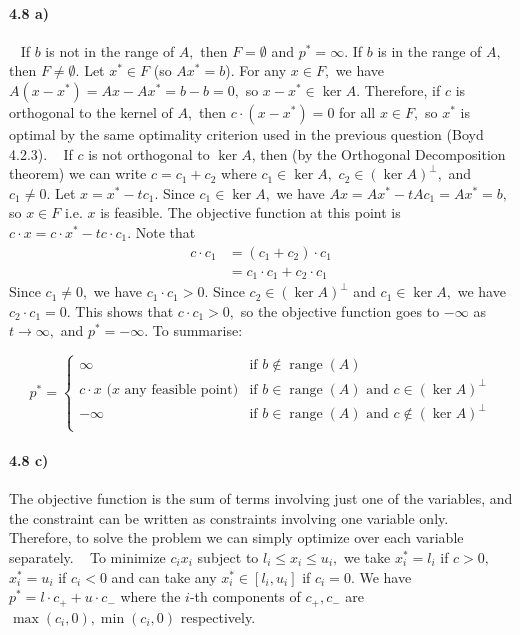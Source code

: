 \documentclass[a4paper,12pt]{article}
\begin{document}
\paragraph{4.8 a)}
\
\newline
If $b$ is not in the range of $A,$ then $F = \emptyset$ and $p^* = \infty.$ If $b$ is in the range of $A,$ then $F\neq \emptyset.$ Let $x^*\in F$ (so $Ax^* = b$). For any $x\in F,$ we have $A(x-x^*) = Ax - Ax^* = b-b = 0,$ so $x-x^*\in \ker A.$ Therefore, if $c$ is orthogonal to the kernel of $A,$ then $c\cdot (x-x^*) = 0$ for all $x\in F,$ so $x^*$ is optimal by the same optimality criterion used in the previous question (Boyd 4.2.3). 
\
\newline
If $c$ is not orthogonal to $\ker A$, then (by the Orthogonal Decomposition theorem) we can write $c = c_1 + c_2$ where $c_1 \in \ker A,$ $c_2 \in (\ker A)^{\perp},$ and $c_1\neq 0.$ Let $x = x^* - tc_1.$ Since $c_1 \in \ker A,$ we have $Ax = Ax^* - tAc_1 = Ax^* = b,$ so $x\in F$ i.e. $x$ is feasible. The objective function at this point is $c\cdot x = c \cdot x^* - t c\cdot c_1.$ Note that
\begin{align*}
 c\cdot c_1 &= (c_1 + c_2)\cdot c_1 \\
            &= c_1\cdot c_1 + c_2 \cdot c_1
\end{align*}
Since $c_1 \neq 0,$ we have $c_1\cdot c_1 > 0.$ Since $c_2 \in (\ker A)^{\perp}$ and $c_1 \in \ker A,$ we have $c_2\cdot c_1 = 0.$ This shows that $c\cdot c_1>0,$ so the objective function goes to $-\infty$ as $t\to \infty,$ and $p^* = -\infty.$  To summarise:


\[
  p^* =
  \begin{cases}
                                   \infty & \text{if $b\notin \operatorname{range}(A)$} \\
                                   c\cdot x \text{ ($x$ any feasible point)} & \text{if $b\in \operatorname{range}(A)$ and $c \in (\ker A)^{\perp}$} \\
                                  -\infty & \text{if $b\in \operatorname{range}(A)$ and $c \notin (\ker A)^{\perp}$} \\
  \end{cases}
\]

\paragraph*{4.8 c)}
The objective function is the sum of terms involving just one of the variables, and the constraint can be written as constraints involving one variable only. Therefore, to solve the problem we can simply optimize over each variable separately.
\
\newline
To minimize $c_i x_i$ subject to $l_i \leq x_i \leq u_i,$ we take $x_i^* = l_i$ if $c>0,$ $x_i^* = u_i$ if $c_i <0$ and can take any $x_i^*\in [l_i, u_i]$ if $c_i =0.$ We have $p^* = l \cdot c_+ + u \cdot c_-$ where the $i$-th components of $c_+, c_-$ are $\max(c_i,0), \min(c_i, 0)$ respectively. 
\end{document}
